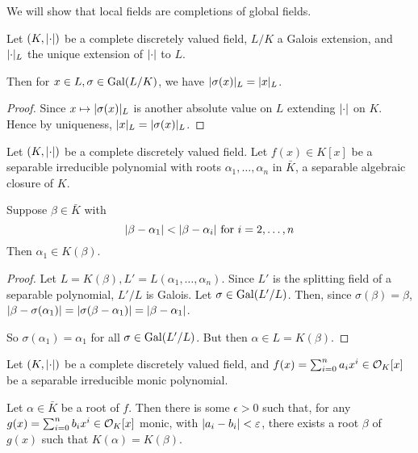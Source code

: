 \documentclass[10pt,a4paper]{article}
\begin{document}
We will show that local fields are completions of global fields.
\begin{lemma}
  Let $(K, \lvert\cdot\rvert)$ be a complete discretely valued field, $L/K$ a Galois extension, and $\lvert\cdot\rvert_L$ the unique extension of $\lvert\cdot\rvert$ to $L$.

  Then for $x \in L, \sigma \in \operatorname{Gal}(L/K)$, we have $\lvert\sigma(x)\rvert_L = \lvert x\rvert_L$.
\end{lemma}
\begin{proof}
  Since $x \mapsto \lvert\sigma(x)\rvert_L$ is another absolute value on $L$ extending $\lvert\cdot\rvert$ on $K$. Hence by uniqueness, $\lvert x\rvert_L = \lvert\sigma(x)\rvert_L$.
\end{proof}
\begin{lemma}
  Let $(K, \lvert\cdot\rvert)$ be a complete discretely valued field. Let $f(x) \in K[x]$ be a separable irreducible polynomial with roots $\alpha_1, \ldots, \alpha_n$ in $\bar{K}$, a separable algebraic closure of $K$.

  Suppose $\beta \in \bar{K}$ with
  \[\lvert\beta-\alpha_1\rvert <\lvert\beta-\alpha_i\rvert\text{ for } i=2,\ldots, n\]
  Then $\alpha_1 \in K(\beta)$.
\end{lemma}
\begin{proof}
  Let $L = K(\beta), L'=L(\alpha_1, \ldots, \alpha_n)$. Since $L'$ is the splitting field of a separable polynomial, $L'/L$ is Galois. Let $\sigma \in \operatorname{Gal}(L'/L)$. Then, since $\sigma(\beta)=\beta$, $\lvert\beta-\sigma(\alpha_1)\rvert = \lvert\sigma(\beta-\alpha_1)\rvert = \lvert\beta-\alpha_1\rvert$.

  So $\sigma(\alpha_1)=\alpha_1$ for all $\sigma \in \operatorname{Gal}(L'/L)$. But then $\alpha \in L = K(\beta)$.
\end{proof}
\begin{proposition}
  Let $(K, \lvert\cdot\rvert)$ be a complete discretely valued field, and $f(x) = \sum_{i=0}^n a_i x^i \in \mathcal{O}_K[x]$ be a separable irreducible monic polynomial.

  Let $\alpha \in \bar{K}$ be a root of $f$. Then there is some $\epsilon > 0$ such that, for any $g(x) = \sum_{i=0}^n b_ix^i \in \mathcal{O}_K[x]$ monic, with $\lvert a_i-b_i\rvert < \varepsilon$, there exists a root $\beta$ of $g(x)$ such that $K(\alpha)=K(\beta)$.
\end{proposition}
\end{document}

